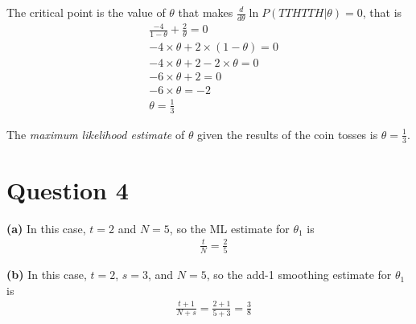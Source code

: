 \documentclass[leqno]{article}
\begin{document}
\noindent The critical point is the value of $\theta$ that makes $\frac{d}{d\theta}\ln P(TTHTTH|\theta) = 0$, that is
\begin{equation*}
\begin{split}
&\frac{-4}{1 - \theta} + \frac{2}{\theta} = 0
\\
&-4 \times \theta + 2 \times (1 - \theta) = 0
\\
&-4 \times \theta + 2 - 2 \times \theta = 0
\\
&-6 \times \theta + 2 = 0
\\
&-6 \times \theta = -2
\\
& \theta = \frac{1}{3}
\end{split}  
\end{equation*} 

\noindent The \textit{maximum likelihood estimate} of $\theta$ given the results of the coin tosses is $\theta = \frac{1}{3}$.

\hfill

\section*{Question 4}

\noindent \textbf{(a)} In this case, $t = 2$ and $N = 5$, so the ML estimate for $\theta_1$ is
\begin{equation*}
\begin{split}
&\frac{t}{N} = \frac{2}{5}
\end{split}  
\end{equation*} 

\hfill

\noindent \textbf{(b)} In this case, $t = 2$, $s = 3$, and $N = 5$, so the add-1 smoothing estimate for $\theta_1$ is 
\begin{equation*}
\begin{split}
&\frac{t + 1}{N + s} = \frac{2 + 1}{5 + 3} = \frac{3}{8}
\end{split}  
\end{equation*} 

\hfill
\end{document}
